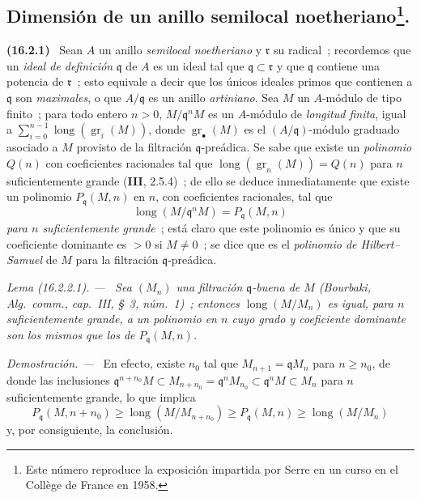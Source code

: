 \documentclass[10pt,oneside]{book}
\makeatletter
\newcommand{\gr}{\operatorname{gr}}
\newcommand{\setmanualcurrentlabel}[1]{\def\@currentlabel{#1}}
\newcommand{\oldpage}[2][]{%
  \setcounter{footnote}{0}%
  \marginpar{\scriptsize\textbf{#1}~|~#2}\ignorespaces}
\newenvironment{env}[1][]{\setmanualcurrentlabel{#1}\par\medskip\noindent\textbf{(#1)}\ }{\par}
\newenvironment{lemma}[1][]{%
  \setmanualcurrentlabel{#1}\par\medskip\noindent\itshape Lema (#1). ---\ }{\par}
\newenvironment{proof}{%
  \par\medskip\noindent\textit{Demostración. ---\ }}{\par}
\providecommand{\setmin}{-}%
\makeatother
\begin{document}
\subsection[Dimensión de un anillo semilocal noetheriano]{Dimensión de un
anillo semilocal noetheriano\protect\footnote{Este número reproduce la exposición
impartida por Serre en un curso en el Collège de France en 1958.}.}
\label{subsection:0.16.2-es}

\begin{env}[16.2.1]
\label{0.16.2.1-es}
Sean $A$ un anillo \emph{semilocal noetheriano} y $\mathfrak{r}$ su radical~;
recordemos que un \emph{ideal de definición} $\mathfrak{q}$ de $A$ es un ideal tal que
$\mathfrak{q}\subset\mathfrak{r}$ y que $\mathfrak{q}$ contiene una potencia de
$\mathfrak{r}$~; esto equivale a decir que los únicos ideales primos que
contienen a $\mathfrak{q}$ son \emph{maximales}, o que $A/\mathfrak{q}$ es un anillo
\emph{artiniano}. Sea $M$ un $A$-módulo de tipo finito~; para todo entero $n>0$,
$M/\mathfrak{q}^nM$ es un $A$-módulo de \emph{longitud finita}, igual a
$\sum_{i=0}^{n\setmin 1}\operatorname{long}(\gr_i(M))$, donde $\gr_\bullet(M)$ es el
$(A/\mathfrak{q})$-módulo graduado asociado a $M$ provisto de la filtración
$\mathfrak{q}$-preádica. Se sabe que existe un \emph{polinomio} $Q(n)$ con
coeficientes racionales tal que $\operatorname{long}(\gr_n(M))=Q(n)$ para $n$
suficientemente grande (\textbf{III}, 2.5.4)~; de ello se deduce inmediatamente que
existe un polinomio $P_{\mathfrak{q}}(M,n)$ en $n$, con coeficientes racionales,
tal que
\[
  \operatorname{long}(M/\mathfrak{q}^nM)=P_{\mathfrak{q}}(M,n)
\]
\emph{para $n$ suficientemente grande}~; está claro que este polinomio es único y que
su coeficiente dominante es $>0$ si $M\neq0$~; se dice que es el \emph{polinomio de
Hilbert--Samuel} de $M$ para la filtración $\mathfrak{q}$-preádica.
\end{env}

\begin{lemma}[16.2.2.1]
\label{0.16.2.2.1-es}
\oldpage[0\textsubscript{IV-1}]{26}
Sea $(M_n)$ una filtración $\mathfrak{q}$-buena de $M$ \textup{(Bourbaki,
\emph{Alg.~comm.}, cap.~III, \S~3, núm.~1)}~; entonces
$\operatorname{long}(M/M_n)$ es igual, para $n$ suficientemente grande, a un
polinomio en $n$ cuyo grado y coeficiente dominante son los mismos que los de
$P_{\mathfrak{q}}(M,n)$.
\end{lemma}

\begin{proof}
En efecto, existe $n_0$ tal que $M_{n+1}=\mathfrak{q}M_n$ para $n\geq n_0$,
de donde las inclusiones
$\mathfrak{q}^{n+n_0}M\subset M_{n+n_0}=\mathfrak{q}^nM_{n_0}
\subset\mathfrak{q}^nM\subset M_n$ para $n$ suficientemente grande, lo que
implica
\[
  P_{\mathfrak{q}}(M,n+n_0)\geq
  \operatorname{long}(M/M_{n+n_0})\geq
  P_{\mathfrak{q}}(M,n)\geq\operatorname{long}(M/M_n)
\]
y, por consiguiente, la conclusión.
\end{proof}
\end{document}
